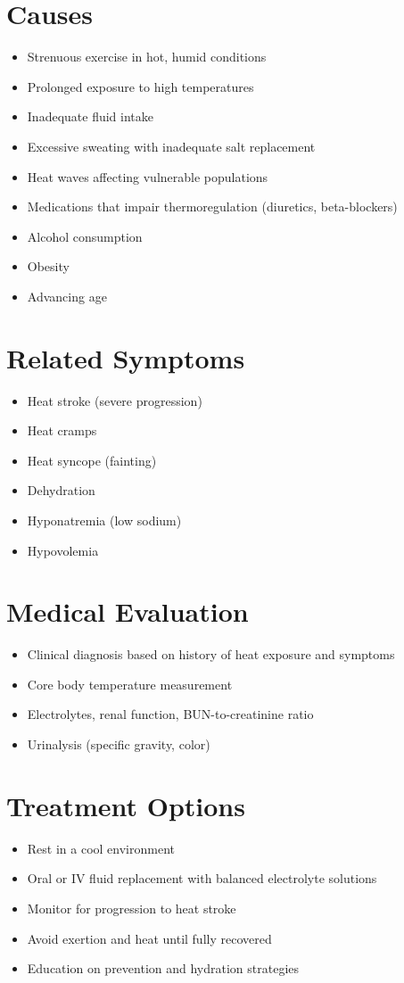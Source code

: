\section*{Causes}
\begin{itemize}
\item Strenuous exercise in hot, humid conditions
\item Prolonged exposure to high temperatures
\item Inadequate fluid intake
\item Excessive sweating with inadequate salt replacement
\item Heat waves affecting vulnerable populations
\item Medications that impair thermoregulation (diuretics, beta-blockers)
\item Alcohol consumption
\item Obesity
\item Advancing age
\end{itemize}

\section*{Related Symptoms}
\begin{itemize}
\item Heat stroke (severe progression)
\item Heat cramps
\item Heat syncope (fainting)
\item Dehydration
\item Hyponatremia (low sodium)
\item Hypovolemia
\end{itemize}

\section*{Medical Evaluation}
\begin{itemize}
\item Clinical diagnosis based on history of heat exposure and symptoms
\item Core body temperature measurement
\item Electrolytes, renal function, BUN-to-creatinine ratio
\item Urinalysis (specific gravity, color)
\end{itemize}

\section*{Treatment Options}
\begin{itemize}
\item Rest in a cool environment
\item Oral or IV fluid replacement with balanced electrolyte solutions
\item Monitor for progression to heat stroke
\item Avoid exertion and heat until fully recovered
\item Education on prevention and hydration strategies
\end{itemize}
